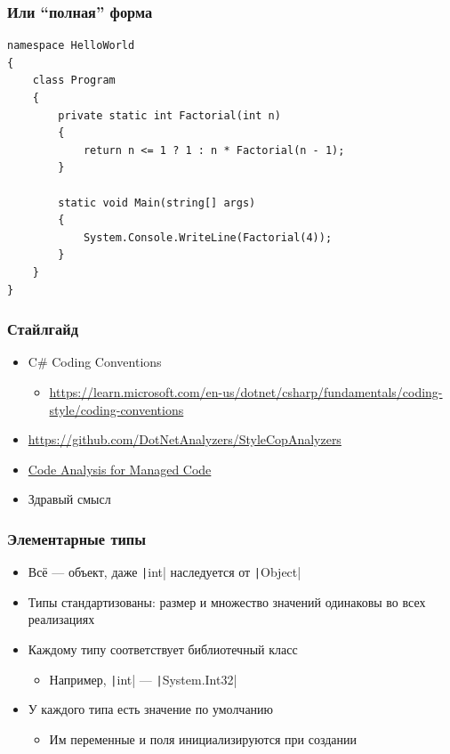 \documentclass{../../slides-style}
\begin{document}
    \begin{frame}[fragile]
        \frametitle{Или \enquote{полная} форма}
        \begin{verbatim}
namespace HelloWorld
{
    class Program
    {
        private static int Factorial(int n) 
        {
            return n <= 1 ? 1 : n * Factorial(n - 1);
        }

        static void Main(string[] args)
        {
            System.Console.WriteLine(Factorial(4));
        }
    }
}
        \end{verbatim}
    \end{frame}

    \begin{frame}
        \frametitle{Стайлгайд}
        \begin{itemize}
            \item C\# Coding Conventions
            \begin{itemize}
                \item \url{https://learn.microsoft.com/en-us/dotnet/csharp/fundamentals/coding-style/coding-conventions}
            \end{itemize}
            \item \url{https://github.com/DotNetAnalyzers/StyleCopAnalyzers}
            \item \href{https://learn.microsoft.com/ru-ru/previous-versions/visualstudio/visual-studio-2015/code-quality/code-analysis-for-managed-code-overview}{Code Analysis for Managed Code}
            \item Здравый смысл
        \end{itemize}
    \end{frame}

    \begin{frame}
        \frametitle{Элементарные типы}
        \begin{itemize}
            \item Всё --- объект, даже \texttt|int| наследуется от \texttt|Object|
            \item Типы стандартизованы: размер и множество значений одинаковы во всех реализациях
            \item Каждому типу соответствует библиотечный класс
            \begin{itemize}
                \item Например, \texttt|int| --- \texttt|System.Int32|
            \end{itemize}
            \item У каждого типа есть значение по умолчанию
            \begin{itemize}
                \item Им переменные и поля инициализируются при создании
            \end{itemize}
        \end{itemize}
    \end{frame}
\end{document}

